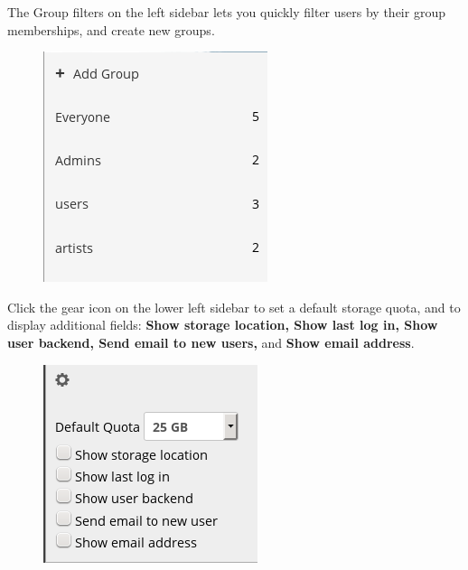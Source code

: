 \documentclass[letterpaper,10pt,english]{sphinxmanual}
\begin{document}
The Group filters on the left sidebar lets you quickly filter users by their
group memberships, and create new groups.
\begin{figure}[htbp]
\centering

\includegraphics{users-config-1.png}
\end{figure}

Click the gear icon on the lower left sidebar to set a default storage quota,
and to display additional fields: \textbf{Show storage location, Show last log in,
Show user backend, Send email to new users,} and \textbf{Show email address}.
\begin{figure}[htbp]
\centering

\includegraphics{users-config-2.png}
\end{figure}
\end{document}
